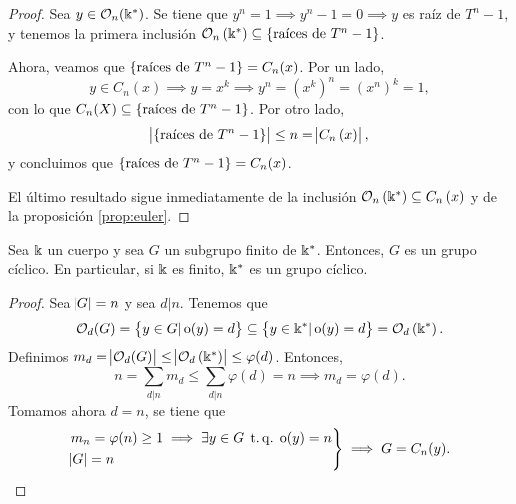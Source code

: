 \begin{proof}
    Sea $y \in \mathcal{O}_n(\Bbbk^\ast)$. Se tiene que  $y^n = 1 \implies y^n -1 = 0 \implies y$ es raíz de $T^n -1$, y tenemos la primera inclusión $\mathcal{O}_n\left( \Bbbk^\ast \right) \subseteq\left\{\text{raíces de } T^n -1\right\}$.
    
    \noindent Ahora, veamos que $\left\{ \text{raíces de } T^n -1\right\} = C_n(x)$. Por un lado,
    \[
        y \in C_n(x) \implies y = x^k \implies y^n = \left( x^k \right)^n = \left( x^n \right)^k = 1,
    \]
    con lo que $C_n(X) \subseteq \left\{\text{raíces de } T^n -1\right\}$. Por otro lado,
    \[
        \abs{\left\{\text{raíces de } T^n -1\right\}}\leq n =\abs{C_n\left( x\right)},
    \]
    y concluimos que $\left\{ \text{raíces de } T^n -1\right\} = C_n(x)$.
    
    \noindent El último resultado sigue inmediatamente de la inclusión $\mathcal{O}_n\left( \Bbbk^\ast \right)\subseteq C_n\left( x\right)$ y de la proposición \ref{prop:euler}.
\end{proof}

\begin{teo*}
    Sea $\Bbbk$ un cuerpo y sea $G$ un subgrupo finito de $\Bbbk^\ast$. Entonces, $G$ es un grupo
    cíclico. En particular, si $\Bbbk$ es finito, $\Bbbk^\ast$ es un grupo cíclico.
\end{teo*}

\begin{proof}
    Sea $\abs{G} = n$ y sea $d \vert n$. Tenemos que
    \[
        \mathcal{O}_d(G) = \left\{y \in G \vert \operatorname{o}(y) = d\right\} \subseteq
        \left\{y \in \Bbbk^\ast \vert \operatorname{o}(y) = d\right\} = \mathcal{O}_d\left( \Bbbk^\ast \right).
    \]
    Definimos $m_d = \abs{\mathcal{O}_d(G)} \leq \abs{\mathcal{O}_d\left( \Bbbk^\ast \right)} \leq \varphi(d)$.
    Entonces,
    \[
        n = \sum_{d \vert n} m_d \leq \sum_{d \vert n} \varphi(d) = n \implies m_d = \varphi(d).
    \]
    Tomamos ahora $d = n$, se tiene que
    \[
        \begin{rcases}
            m_n = \varphi(n) \geq 1 \implies \exists y \in G \operatorname{\;t.q.\;} \operatorname{o}(y) = n \\
            \abs{G} = n
        \end{rcases}
        \implies G = C_n(y).
    \]
\end{proof}
